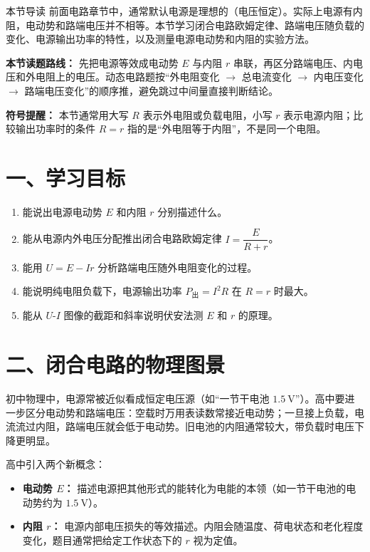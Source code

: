 
\begin{learningbox}{本节导读}
前面电路章节中，通常默认电源是理想的（电压恒定）。实际上电源有内阻，电动势和路端电压并不相等。本节学习闭合电路欧姆定律、路端电压随负载的变化、电源输出功率的特性，以及测量电源电动势和内阻的实验方法。
\end{learningbox}

\textbf{本节读题路线：} 先把电源等效成电动势 $E$ 与内阻 $r$ 串联，再区分路端电压、内电压和外电阻上的电压。动态电路题按“外电阻变化 $\to$ 总电流变化 $\to$ 内电压变化 $\to$ 路端电压变化”的顺序推，避免跳过中间量直接判断结论。

\textbf{符号提醒：} 本节通常用大写 $R$ 表示外电阻或负载电阻，小写 $r$ 表示电源内阻；比较输出功率时的条件 $R=r$ 指的是“外电阻等于内阻”，不是同一个电阻。

\section*{一、学习目标}

\begin{enumerate}
  \item 能说出电源电动势 $E$ 和内阻 $r$ 分别描述什么。
  \item 能从电源内外电压分配推出闭合电路欧姆定律 $I = \dfrac{E}{R+r}$。
  \item 能用 $U = E - Ir$ 分析路端电压随外电阻变化的过程。
  \item 能说明纯电阻负载下，电源输出功率 $P_{\text{出}} = I^2R$ 在 $R = r$ 时最大。
  \item 能从 $U$-$I$ 图像的截距和斜率说明伏安法测 $E$ 和 $r$ 的原理。
\end{enumerate}
\section*{二、闭合电路的物理图景}

初中物理中，电源常被近似看成恒定电压源（如“一节干电池 $1.5\ \mathrm{V}$”）。高中要进一步区分电动势和路端电压：空载时万用表读数常接近电动势；一旦接上负载，电流流过内阻，路端电压就会低于电动势。旧电池的内阻通常较大，带负载时电压下降更明显。

高中引入两个新概念：
\begin{itemize}
  \item \textbf{电动势 $E$：} 描述电源把其他形式的能转化为电能的本领（如一节干电池的电动势约为 $1.5\ \mathrm{V}$）。
  \item \textbf{内阻 $r$：} 电源内部电压损失的等效描述。内阻会随温度、荷电状态和老化程度变化，题目通常把给定工作状态下的 $r$ 视为定值。
\end{itemize}

